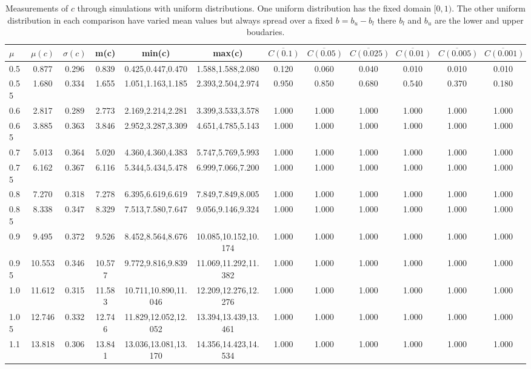 \begin{table*}[h!]
\begin{center}
\begin{tabular}{| l | c | c | c | c | c | c | c | c | c | c | c |}\hline
$\mu$ & $\mu(c)$ & $\sigma(c)$ & m(c) & min(c) & max(c) & $\overline{C(0.1)}$ & $\overline{C(0.05)}$ & $\overline{C(0.025)}$ & $\overline{C(0.01)}$ & $\overline{C(0.005)}$ & $\overline{C(0.001)}$ \\\hline
0.5 & 0.877 & 0.296 & 0.839 & 0.425,0.447,0.470 & 1.588,1.588,2.080  & 0.120  & 0.060  & 0.040  & 0.010  & 0.010  & 0.010 \\\hline
0.55 & 1.680 & 0.334 & 1.655 & 1.051,1.163,1.185 & 2.393,2.504,2.974  & 0.950  & 0.850  & 0.680  & 0.540  & 0.370  & 0.180 \\\hline
0.6 & 2.817 & 0.289 & 2.773 & 2.169,2.214,2.281 & 3.399,3.533,3.578  & 1.000  & 1.000  & 1.000  & 1.000  & 1.000  & 1.000 \\\hline
0.65 & 3.885 & 0.363 & 3.846 & 2.952,3.287,3.309 & 4.651,4.785,5.143  & 1.000  & 1.000  & 1.000  & 1.000  & 1.000  & 1.000 \\\hline
0.7 & 5.013 & 0.364 & 5.020 & 4.360,4.360,4.383 & 5.747,5.769,5.993  & 1.000  & 1.000  & 1.000  & 1.000  & 1.000  & 1.000 \\\hline
0.75 & 6.162 & 0.367 & 6.116 & 5.344,5.434,5.478 & 6.999,7.066,7.200  & 1.000  & 1.000  & 1.000  & 1.000  & 1.000  & 1.000 \\\hline
0.8 & 7.270 & 0.318 & 7.278 & 6.395,6.619,6.619 & 7.849,7.849,8.005  & 1.000  & 1.000  & 1.000  & 1.000  & 1.000  & 1.000 \\\hline
0.85 & 8.338 & 0.347 & 8.329 & 7.513,7.580,7.647 & 9.056,9.146,9.324  & 1.000  & 1.000  & 1.000  & 1.000  & 1.000  & 1.000 \\\hline
0.9 & 9.495 & 0.372 & 9.526 & 8.452,8.564,8.676 & 10.085,10.152,10.174  & 1.000  & 1.000  & 1.000  & 1.000  & 1.000  & 1.000 \\\hline
0.95 & 10.553 & 0.346 & 10.577 & 9.772,9.816,9.839 & 11.069,11.292,11.382  & 1.000  & 1.000  & 1.000  & 1.000  & 1.000  & 1.000 \\\hline
1.0 & 11.612 & 0.315 & 11.583 & 10.711,10.890,11.046 & 12.209,12.276,12.276  & 1.000  & 1.000  & 1.000  & 1.000  & 1.000  & 1.000 \\\hline
1.05 & 12.746 & 0.332 & 12.746 & 11.829,12.052,12.052 & 13.394,13.439,13.461  & 1.000  & 1.000  & 1.000  & 1.000  & 1.000  & 1.000 \\\hline
1.1 & 13.818 & 0.306 & 13.841 & 13.036,13.081,13.170 & 14.356,14.423,14.534  & 1.000  & 1.000  & 1.000  & 1.000  & 1.000  & 1.000 \\\hline
\end{tabular}
\caption{Measurements of $c$ through simulations
with uniform distributions.
One uniform distribution has the fixed domain $[0,1)$.
The other uniform distribution in each comparison
have varied mean values but always
spread over a fixed $b=b_u-b_l$ there $b_l$ and $b_u$ are the lower and upper boudaries.}
\end{center}
\end{table*}